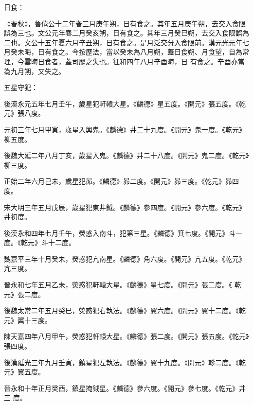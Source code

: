 \begin{pinyinscope}
 日食：



 《春秋》，魯僖公十二年春三月庚午朔，日有食之。其年五月庚午朔，去交入食限誤為三也。文公元年春二月癸亥朔，日有食之。其年三月癸巳朔，去交入食限誤為二也。文公十五年夏六月辛丑朔，日有食之。是月泛交分入食限前。漢元光元年七月癸未晦，日有食之。今按歷法，當以癸未為八月朔，蓋日食朔、月食望，自為常理，今雲晦日食者，蓋司歷之失也。征和四年八月辛酉晦，日
 有食之。辛酉亦當為九月朔，又失之。



 五星守犯：



 後漢永元五年七月壬午，歲星犯軒轅大星。《麟德》星五度。《開元》張五度。《乾元》張八度。



 元初三年七月甲寅，歲星入輿鬼。《麟德》井二十九度。《開元》鬼一度。《乾元》柳五度。



 後魏大延二年八月丁亥，歲星入鬼。《麟德》井二十八度。《開元》鬼二度。《乾元》柳三度。



 正始二年六月己未，歲星犯昴。《麟德》昴二度。《開元》昴三度。《乾元》昴四度。



 宋大明三年五月戊辰，歲星犯東井鉞。《麟德》參四度。《開元》參六度。《乾元》井初度。



 後漢永和四年七月壬午，熒惑入南斗，犯第三星。《麟德》箕七度。《開元》斗一度。《乾元》斗十二度。



 魏嘉平三年十月癸未，熒惑犯亢南星。《麟德》角六度。《開元》亢五度。《乾元》亢三度。



 晉永和七年五月乙未，熒惑犯軒轅大星。《麟德》星七度。《開元》張二度。《
 乾元》張二度。



 後魏太常二年五月癸巳，熒惑犯右執法。《麟德》翼六度。《開元》翼十二度。《乾元》翼十三度。



 陳天嘉四年八月甲午，熒惑犯軒轅大星。《麟德》張二度。《開元》張五度。《乾元》張四度。



 後漢延光三年九月壬寅，鎮星犯左執法。《麟德》翼十九度。《開元》軫二度。《乾元》翼五度。



 晉永和十年正月癸酉，鎮星掩鉞星。《麟德》參六度。《開元》參七度。《乾元》井三
 度。




\end{pinyinscope}

